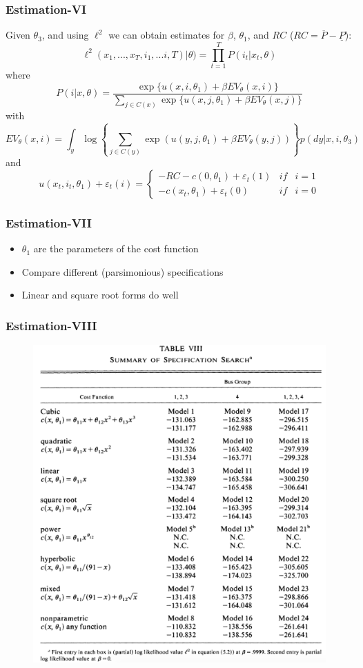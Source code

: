 \documentclass{beamer}
\begin{document}
\begin{frame}
\frametitle{Estimation-VI}
Given $\theta_3$, and using $\ell^2$ we can obtain estimates for $\beta$, $\theta_1$, and $RC$ ($RC=\overline{P}-\underline{P}$):
\[\ell^2(x_1,{...},x_T,i_1,{...}i,T)|\theta)=\prod_{t=1}^T P(i_t|x_t,\theta)\] where \[P(i|x,\theta)=\frac{\exp\{u(x,i,\theta_1)+\beta EV_\theta(x,i)\}}{\sum_{j\in C(x)}\exp\{u(x,j,\theta_1)+\beta EV_\theta(x,j)\}}\] with
\[EV_\theta(x,i)=\int_y\log\left\{ \sum_{j\in C(y)}\exp(u(y,j,\theta_1)+\beta EV_\theta (y,j))\right\}p(dy|x,i,\theta_3)\] and
\[u(x_t,i_t,\theta_1)+\varepsilon_t(i)=\left\{\begin{array}{lll} -RC-c(0,\theta_1)+\varepsilon_t(1)&if & i=1\\ -c(x_t,\theta_1)+\varepsilon_t(0)&if&i=0\end{array}\right.\]
\end{frame}


\begin{frame}
\frametitle{Estimation-VII}
\begin{itemize}
\item $\theta_1$ are the parameters of the cost function
\bigskip
\item Compare different (parsimonious) specifications 
\bigskip
\item Linear and square root forms do well
\end{itemize}
\end{frame}

\begin{frame}
\frametitle{Estimation-VIII}
\begin{center}
\begin{figure}[h!]
\includegraphics[scale =0.4]{t8.png}
\end{figure}
\end{center}
\end{frame}
\end{document}
